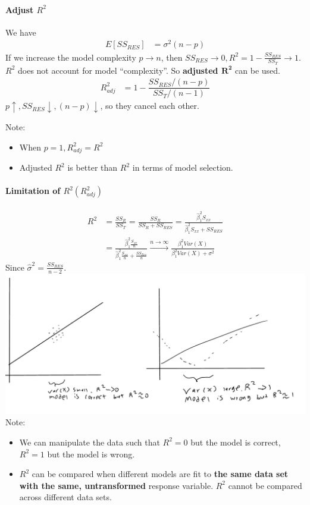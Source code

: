 \documentclass[12 pt]{article}
\begin{document}
  \paragraph{Adjust $R^2$}
  We have
  \begin{align*}
    E[SS_{RES}] & = \sigma^2 (n-p)
  \end{align*}
  If we increase the model complexity $p \to n$, then $SS_{RES} \to 0,
  R^2 = 1 - \frac{SS_{RES}}{SS_T} \to 1$.
  \\ $R^2$ does not account for model ``complexity''. So \textbf{adjusted
    $\mathbf{R^2}$} can be used.
  \begin{align*}
    R_{adj}^2 & = 1 - \dfrac{SS_{RES}/(n-p)}{SS_T/(n-1)}
  \end{align*}
  $p \uparrow, SS_{RES} \downarrow, (n-p) \downarrow$, so they cancel
  each other.

  Note:
  \begin{itemize}
  \item When $p = 1, R^2_{adj} = R^2$
  \item Adjusted $R^2$ is better than $R^2$ in terms of model selection.
  \end{itemize}
  \paragraph{Limitation of $R^2(R^2_{adj})$}
  \begin{align*}
    R^2 & = \frac{SS_{R}}{SS_T} = \frac{SS_R}{SS_R + SS_{RES}} = \frac{\hat{\beta}_1^2 S_{xx}}{\hat{\beta}_1^2S_{xx}+ SS_{RES}}
    \\ & = \frac{\hat{\beta}_1^2 \frac{S_{xx}}{n}}{\hat{\beta}_1^2 \frac{S_{xx}}{n} + \frac{SS_{Res}}{n}} \stackrel{n \to \infty}{\to} \frac{\beta_1^2 Var(X)}{\beta_1^2 Var(X) + \sigma^2}
  \end{align*}
  Since $\hat{\sigma}^2 = \frac{SS_{RES}}{n-2}$.
  \\ \includegraphics[width=.9\textwidth]{25.pdf}\\
  Note:
  \begin{itemize}
  \item We can manipulate the data such that $R^2=0$ but the model is
    correct, $R^2 = 1$ but the model is wrong.
  \item $R^2$ can be compared when different models are fit to
    \textbf{the same data set with the same, untransformed} response
    variable. $R^2$ cannot be compared across different data sets.
  \end{itemize}
\end{document}
